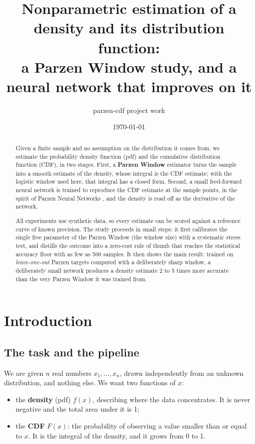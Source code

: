 \documentclass[11pt]{article}
\title{Nonparametric estimation of a density and its distribution function:\\
a Parzen Window study, and a neural network that improves on it}
\author{parzen-cdf project work}
\date{\today}
\begin{document}
\maketitle

\begin{abstract}
\noindent Given a finite sample and no assumption on the distribution it comes from, we
estimate the probability density function (pdf) and the cumulative distribution function
(CDF), in two stages. First, a \textbf{Parzen Window} estimator \cite{parzen1962} turns the
sample into a smooth estimate of the density, whose integral is the CDF estimate; with the
logistic window used here, that integral has a closed form. Second, a small feed-forward
neural network is trained to reproduce the CDF estimate at the sample points, in the spirit
of Parzen Neural Networks \cite{trentin2018}, and the density is read off as the derivative
of the network.

All experiments use synthetic data, so every estimate can be scored against a reference
curve of known precision. The study proceeds in small steps: it first calibrates the single
free parameter of the Parzen Window (the window size) with a systematic stress test, and
distills the outcome into a zero-cost rule of thumb that reaches the statistical accuracy
floor with as few as 500 samples. It then shows the main result: trained on
\emph{leave-one-out} Parzen targets computed with a deliberately sharp window, a
deliberately small network produces a density estimate 2 to 5 times more accurate than the
very Parzen Window it was trained from.
\end{abstract}

\tableofcontents

\section{Introduction}

\subsection{The task and the pipeline}

We are given $n$ real numbers $x_1, \dots, x_n$, drawn independently from an unknown
distribution, and nothing else. We want two functions of $x$:

\begin{itemize}
  \item the \textbf{density} (pdf) $f(x)$, describing where the data concentrates. It is
        never negative and the total area under it is 1;
  \item the \textbf{CDF} $F(x)$: the probability of observing a value smaller than or equal
        to $x$. It is the integral of the density, and it grows from 0 to 1.
\end{itemize}
\end{document}
